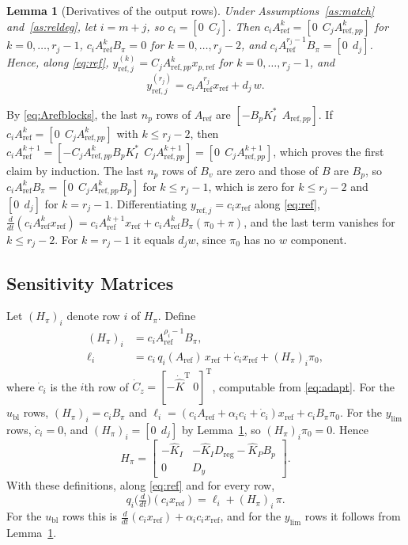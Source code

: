 \documentclass[lettersize,journal]{IEEEtran}
\newtheorem{lemma}{Lemma}
\newcommand{\Kh}{\hat{K}}
\newcommand{\Khd}{\dot{\hat{K}}}
\newcommand{\xr}{x_{\mathrm{ref}}}
\newcommand{\xpr}{x_{p,\mathrm{ref}}}
\newcommand{\Ar}{A_{\mathrm{ref}}}
\newcommand{\App}{A_{\mathrm{ref},pp}}
\newcommand{\ub}{u_{\mathrm{bl}}}
\newcommand{\ylim}{y_{\mathrm{lim}}}
\newcommand{\Dreg}{D_{\mathrm{reg}}}
\newcommand{\T}{\mathrm{T}}
\begin{document}
\begin{lemma}[Derivatives of the output rows] \label{lem:outder}
Under Assumptions~\ref{as:match} and~\ref{as:reldeg}, let $i=m+j$, so $c_i=[0\ \ C_j]$. Then $c_i\Ar^k=[0\ \ C_j\App^k]$ for $k=0,\dots,r_j-1$, $c_i\Ar^kB_\pi=0$ for $k=0,\dots,r_j-2$, and $c_i\Ar^{r_j-1}B_\pi=[0\ \ d_j]$. Hence, along \eqref{eq:ref}, $y^{(k)}_{\mathrm{ref},j}=C_j\App^k\xpr$ for $k=0,\dots,r_j-1$, and
\begin{equation}
y^{(r_j)}_{\mathrm{ref},j}=c_i\Ar^{r_j}\xr+d_j\,w. \label{eq:yr}
\end{equation}
\end{lemma}
\begin{IEEEproof}
By \eqref{eq:Arefblocks}, the last $n_p$ rows of $\Ar$ are $[-B_pK_I^*\ \ \App]$. If $c_i\Ar^k=[0\ \ C_j\App^k]$ with $k\le r_j-2$, then $c_i\Ar^{k+1}=[-C_j\App^kB_pK_I^*\ \ C_j\App^{k+1}]=[0\ \ C_j\App^{k+1}]$, which proves the first claim by induction. The last $n_p$ rows of $B_v$ are zero and those of $B$ are $B_p$, so $c_i\Ar^kB_\pi=[0\ \ C_j\App^kB_p]$ for $k\le r_j-1$, which is zero for $k\le r_j-2$ and $[0\ \ d_j]$ for $k=r_j-1$. Differentiating $y_{\mathrm{ref},j}=c_i\xr$ along \eqref{eq:ref}, $\frac{d}{dt}(c_i\Ar^k\xr)=c_i\Ar^{k+1}\xr+c_i\Ar^kB_\pi(\pi_0+\pi)$, and the last term vanishes for $k\le r_j-2$. For $k=r_j-1$ it equals $d_jw$, since $\pi_0$ has no $w$ component.
\end{IEEEproof}

\subsection{Sensitivity Matrices}

Let $(H_\pi)_i$ denote row $i$ of $H_\pi$. Define
\begin{equation}
\begin{aligned}
(H_\pi)_i&=c_i\Ar^{\rho_i-1}B_\pi,\\
\ell_i&=c_i\,q_i(\Ar)\,\xr+\dot c_i\xr+(H_\pi)_i\pi_0,
\end{aligned} \label{eq:ell}
\end{equation}
where $\dot c_i$ is the $i$th row of $\dot C_z=[-\Khd^\T\ 0]^\T$, computable from \eqref{eq:adapt}. For the $\ub$ rows, $(H_\pi)_i=c_iB_\pi$ and $\ell_i=(c_i\Ar+\alpha_ic_i+\dot c_i)\xr+c_iB_\pi\pi_0$. For the $\ylim$ rows, $\dot c_i=0$, and $(H_\pi)_i=[0\ \ d_j]$ by Lemma~\ref{lem:outder}, so $(H_\pi)_i\pi_0=0$. Hence
\begin{equation}
H_\pi = \begin{bmatrix}-\Kh_I & -\Kh_I\Dreg-\Kh_P B_p\\ 0 & D_y\end{bmatrix}. \label{eq:Hpi}
\end{equation}
With these definitions, along \eqref{eq:ref} and for every row,
\begin{equation}
q_i\big(\tfrac{d}{dt}\big)(c_i\xr)=\ell_i+(H_\pi)_i\,\pi. \label{eq:qcx}
\end{equation}
For the $\ub$ rows this is $\frac{d}{dt}(c_i\xr)+\alpha_ic_i\xr$, and for the $\ylim$ rows it follows from Lemma~\ref{lem:outder}.
\end{document}
